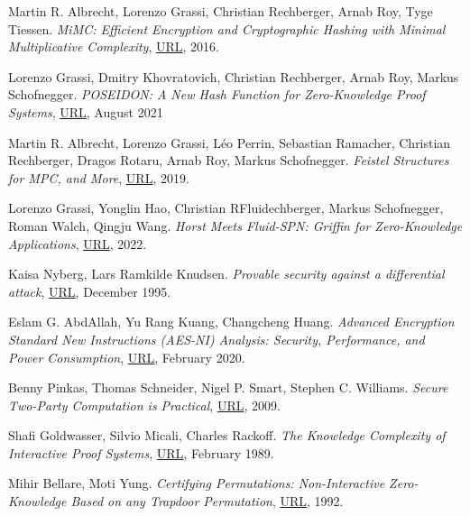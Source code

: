 \documentclass{Resources/UoBLab1}
\theoremstyle{definition}
\begin{document}
\setlength{\labelsep}{10pt} %
\begin{thebibliography}{10}
 Martin R. Albrecht, Lorenzo Grassi, Christian Rechberger, Arnab Roy, Tyge Tiessen. \textit{MiMC: Efficient Encryption and Cryptographic Hashing with Minimal Multiplicative Complexity}, \href{https://eprint.iacr.org/2016/492.pdf}{URL}, 2016.

 Lorenzo Grassi, Dmitry Khovratovich, Christian Rechberger, Arnab Roy, Markus Schofnegger. \textit{POSEIDON: A New Hash Function for Zero-Knowledge Proof Systems}, \href{https://www.usenix.org/system/files/sec21-grassi.pdf}{URL}, August 2021

 Martin R. Albrecht, Lorenzo Grassi, Léo Perrin, Sebastian Ramacher, Christian Rechberger, Dragos Rotaru, Arnab Roy, Markus Schofnegger. \textit{Feistel Structures for MPC, and More}, \href{https://eprint.iacr.org/2019/397.pdf}{URL}, 2019.

 Lorenzo Grassi, Yonglin Hao, Christian RFluidechberger, Markus Schofnegger, Roman Walch, Qingju Wang. \textit{Horst Meets Fluid-SPN: Griffin for Zero-Knowledge Applications}, \href{https://eprint.iacr.org/2022/403.pdf}{URL}, 2022.

 Kaisa Nyberg, Lars Ramkilde Knudsen. \textit{Provable security against a differential attack}, \href{https://link.springer.com/article/10.1007/BF00204800}{URL}, December 1995.

 Eslam G. AbdAllah, Yu Rang Kuang, Changcheng Huang. \textit{Advanced Encryption Standard New Instructions (AES-NI) Analysis: Security, Performance, and Power Consumption}, \href{https://www.sce.carleton.ca/faculty/huang/iccae-2020.pdf}{URL}, February 2020.

 Benny Pinkas, Thomas Schneider, Nigel P. Smart, Stephen C. Williams. \textit{Secure Two-Party Computation is Practical}, \href{https://eprint.iacr.org/2009/314.pdf}{URL}, 2009.

 Shafi Goldwasser, Silvio Micali, Charles Rackoff. \textit{The Knowledge Complexity of Interactive Proof Systems}, \href{https://people.csail.mit.edu/silvio/Selected%20Scientific%20Papers/Proof%20Systems/The_Knowledge_Complexity_Of_Interactive_Proof_Systems.pdf}{URL}, February 1989.

 Mihir Bellare, Moti Yung. \textit{Certifying Permutations: Non-Interactive Zero-Knowledge Based on any Trapdoor Permutation}, \href{https://cseweb.ucsd.edu/~mihir/papers/cct.pdf}{URL}, 1992.


\end{thebibliography}
\end{document}
